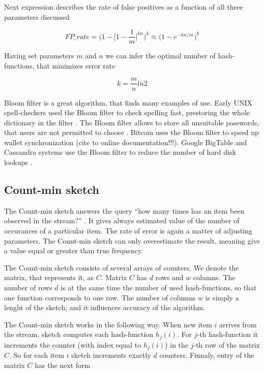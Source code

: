 Next expression describes the rate of false positives as a function of all three parameters discussed

$$
FP\_rate = \Bigg(1 - \Bigg[1 - \frac{1}{m}\Bigg]^{kn}\Bigg)^k \approx \Big(1 - e^{-kn/m}\Big)^k
$$

Having set parameters $m$ and $n$ we can infer the optimal number of hash-functions, that minimizes error rate

$$
k = \frac{m}{n}ln2
$$

Bloom filter is a great algorithm, that finds many examples of use.
Early UNIX spell-checkers used the Bloom filter to check spelling fast, prestoring the whole dictionary in the filter \cite{BroderMitzenmacher2005}.
The Bloom filter allows to store all unsuitable passwords, that users are not permitted to choose \cite{BroderMitzenmacher}.
Bitcoin uses the Bloom filter to speed up wallet synchronization (cite to online documentation!!!).
Google BigTable and Cassandra systems use the Bloom filter to reduce the number of hard disk lookups \cite{Bigtable/Chang_Dean_Ghemawat}.

\subsection{Count-min sketch}

The Count-min sketch answers the query ``how many times has an item been observed in the stream?''  \cite{Cormode}.
It gives always estimated value of the number of occurances of a particular item.
The rate of error is again a matter of adjusting parameters.
The Count-min sketch can only overestimate the result, meaning give a value equal or greater than true frequency.

The Count-min sketch consists of several arrays of counters.
We denote the matrix, that represents it, as $C$.
Matrix $C$ has $d$ rows and $w$ columns.
The number of rows $d$ is at the same time the number of used hash-functions, so that one function corresponds to one row.
The number of columns $w$ is simply a lenght of the sketch, and it influences accuracy of the algorithm.

The Count-min sketch works in the following way.
When new item $i$ arrives from the stream, sketch computes each hash-function $h_j(i)$.
For $j$-th hash-function it increments the counter (with index equal to $h_j(i)$) in the $j$-th row of the matrix $C$.
So for each item $i$ sketch increments exactly $d$ counters.
Finnaly, entry of the matrix $C$ has the next form

